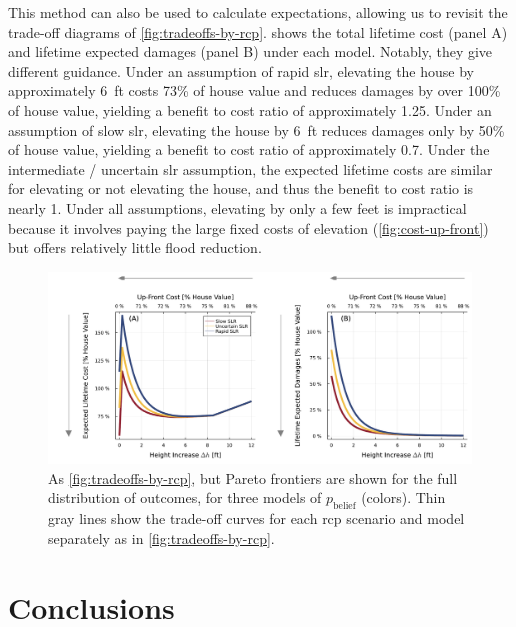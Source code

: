 \documentclass[11pt]{article}
\begin{document}
This method can also be used to calculate expectations, allowing us to revisit the trade-off diagrams of \cref{fig:tradeoffs-by-rcp}.
 shows the total lifetime cost (panel A) and lifetime expected damages (panel B) under each model.
Notably, they give different guidance.
Under an assumption of rapid \gls{slr}, elevating the house by approximately \SI{6}{ft} costs 73\% of house value and reduces damages by over 100\% of house value, yielding a benefit to cost ratio of approximately 1.25.
Under an assumption of slow \gls{slr}, elevating the house by \SI{6}{ft} reduces damages only by 50\% of house value, yielding a benefit to cost ratio of approximately 0.7.
Under the intermediate / uncertain \gls{slr} assumption, the expected lifetime costs are similar for elevating or not elevating the house, and thus the benefit to cost ratio is nearly 1.
Under all assumptions, elevating by only a few feet is impractical because it involves paying the large fixed costs of elevation (\cref{fig:cost-up-front}) but offers relatively little flood reduction.

\begin{figure}
    \centering
    \includegraphics[width=\textwidth]{tradeoffs-by-prior}
    \caption{
        As \cref{fig:tradeoffs-by-rcp}, but Pareto frontiers are shown for the full distribution of outcomes, for three models of $p_\mathrm{belief}$ (colors).
        Thin gray lines show the trade-off curves for each \gls{rcp} scenario and model separately as in \cref{fig:tradeoffs-by-rcp}.
    }\label{fig:tradeoffs-by-prior}
\end{figure}

\section{Conclusions}\label{sec:conclusions}
\end{document}
